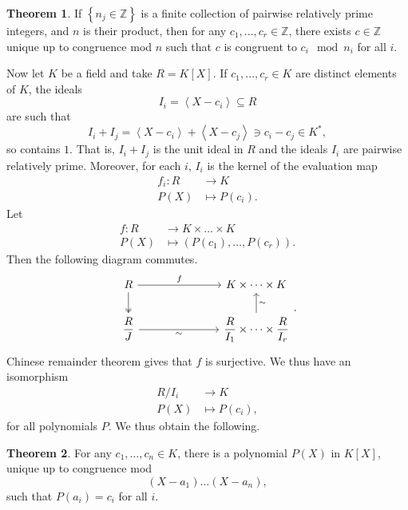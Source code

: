 \documentclass{article}
\newcommand{\Z}{\mathbb{Z}}
\newcommand{\rb}[1]{\left( #1 \right)}
\renewcommand{\sb}[1]{\left[ #1 \right]}
\newcommand{\cb}[1]{\left\{ #1 \right\}}
\newcommand{\ab}[1]{\left\langle #1 \right\rangle}
\theoremstyle{definition}\newtheorem{definition}{Definition}[subsection]
\theoremstyle{definition}\newtheorem{remark}[definition]{Remark}
\theoremstyle{definition}\newtheorem*{example}{Example}
\theoremstyle{definition}\newtheorem*{note}{Note}
\newtheorem{theorem}[definition]{Theorem}
\begin{document}
\begin{theorem}
If $ \cb{n_j \in \Z} $ is a finite collection of pairwise relatively prime integers, and $ n $ is their product, then for any $ c_1, \dots, c_r \in \Z $, there exists $ c \in \Z $ unique up to congruence mod $ n $ such that $ c $ is congruent to $ c_i \mod n_i $ for all $ i $.
\end{theorem}

Now let $ K $ be a field and take $ R = K\sb{X} $. If $ c_1, \dots, c_r \in K $ are distinct elements of $ K $, the ideals
$$ I_i = \ab{X - c_i} \subseteq R $$
are such that
$$ I_i + I_j = \ab{X - c_i} + \ab{X - c_j} \ni c_i - c_j \in K^*, $$
so contains $ 1 $. That is, $ I_i + I_j $ is the unit ideal in $ R $ and the ideals $ I_i $ are pairwise relatively prime. Moreover, for each $ i $, $ I_i $ is the kernel of the evaluation map
\begin{align*}
f_i : R & \to K \\
P\rb{X} & \mapsto P\rb{c_i}.
\end{align*}
Let
\begin{align*}
f : R & \to K \times \dots \times K \\
P\rb{X} & \mapsto \rb{P\rb{c_1}, \dots, P\rb{c_r}}.
\end{align*}
Then the following diagram commutes.
$$
\begin{tikzcd}[column sep=1in]
R \arrow{r}{f} \arrow[twoheadrightarrow]{d} & K \times \dots \times K \\
\dfrac{R}{J} \arrow[swap]{r}{\sim} & \dfrac{R}{I_1} \times \dots \times \dfrac{R}{I_r} \arrow[swap]{u}{\sim}
\end{tikzcd}.
$$
Chinese remainder theorem gives that $ f $ is surjective. We thus have an isomorphism
\begin{align*}
R / I_i & \to K \\
P\rb{X} & \mapsto P\rb{c_i},
\end{align*}
for all polynomials $ P $. We thus obtain the following.

\begin{theorem}
For any $ c_1, \dots, c_n \in K $, there is a polynomial $ P\rb{X} $ in $ K\sb{X} $, unique up to congruence mod
$$ \rb{X - a_1} \dots \rb{X - a_n}, $$
such that $ P\rb{a_i} = c_i $ for all $ i $.
\end{theorem}

\pagebreak

\end{document}
